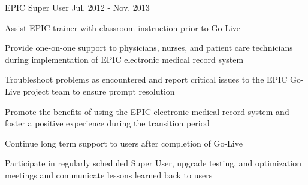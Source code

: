 \begin{cventries}
  \cventry
    {EPIC Super User}
    {}
    {}
    {Jul. 2012 - Nov. 2013}
    {
      \begin{cvitems}
        \item {Assist EPIC trainer with classroom instruction prior to Go-Live}
        \item {Provide one-on-one support to physicians, nurses, and patient care technicians during implementation of EPIC electronic medical record system}
        \item {Troubleshoot problems as encountered and report critical issues to the EPIC Go-Live project team to ensure prompt resolution}
        \item {Promote the benefits of using the EPIC electronic medical record system and foster a positive experience during the transition period}
        \item {Continue long term support to users after completion of Go-Live}
        \item {Participate in regularly scheduled Super User, upgrade testing, and optimization meetings and communicate lessons learned back to users}
      \end{cvitems}
    }
\end{cventries}
\newpage
